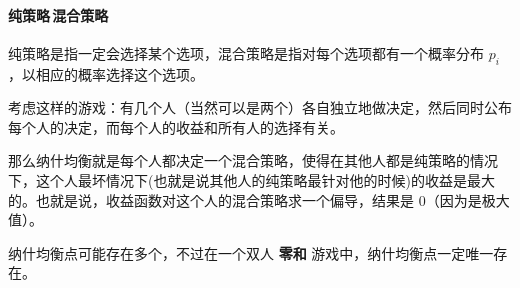 \paragraph{纯策略\,混合策略} 纯策略是指一定会选择某个选项，混合策略是指对每个选项都有一个概率分布 $p_i$，以相应的概率选择这个选项。

考虑这样的游戏：有几个人（当然可以是两个）各自独立地做决定，然后同时公布每个人的决定，而每个人的收益和所有人的选择有关。

那么纳什均衡就是每个人都决定一个混合策略，使得在其他人都是纯策略的情况下，这个人最坏情况下(也就是说其他人的纯策略最针对他的时候)的收益是最大的。也就是说，收益函数对这个人的混合策略求一个偏导，结果是 0（因为是极大值）。

纳什均衡点可能存在多个，不过在一个双人 \textbf{零和} 游戏中，纳什均衡点一定唯一存在。
